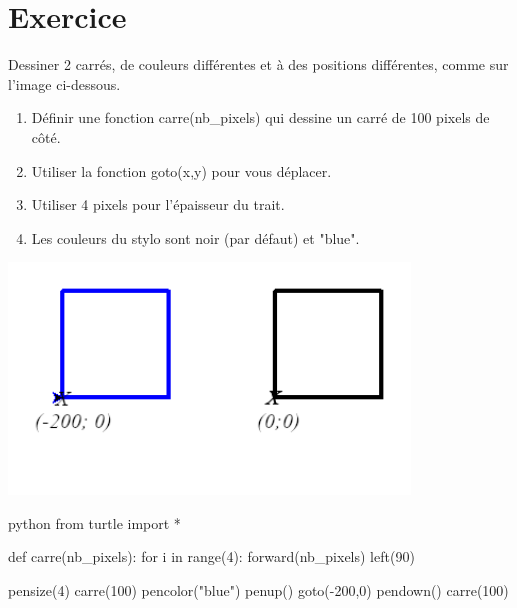 \documentclass[a4paper,11pt]{article}
\begin{document}
\section{Exercice}
Dessiner 2 carrés, de couleurs différentes et à des positions différentes, comme sur l'image ci-dessous.
\begin{multicols}{2}
\begin{enumerate}
\item Définir une fonction carre(nb_pixels) qui dessine un carré de 100 pixels de côté.
\item Utiliser la fonction goto(x,y) pour vous déplacer.
\item Utiliser 4 pixels pour l'épaisseur du trait.
\item Les couleurs du stylo sont noir (par défaut) et "blue".
\end{enumerate}
\begin{center}
\includegraphics[width=0.8\textwidth]{images/TurtleCarres.png}\\
\end{center}
\end{multicols}

\begin{solution}
\begin{code}{python}
from turtle import *

def carre(nb_pixels):
    for i in range(4):
        forward(nb_pixels)
        left(90)

pensize(4)
carre(100)
pencolor("blue")
penup()
goto(-200,0)
pendown()
carre(100)
\end{code}
\end{solution}
\end{document}
